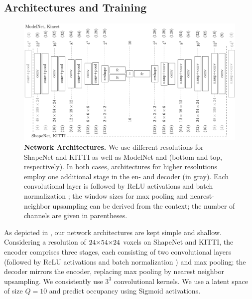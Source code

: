 \subsection{Architectures and Training}
\label{sec:training}

\begin{figure}
    \vspace*{-\figskipabove px}
    \centering
    \hspace*{-4px}
    \includegraphics[width=1.025\linewidth]{fig_architectures}
    \vspace*{-12px}
    \caption{{\bf Network Architectures.} We use different resolutions for ShapeNet and KITTI as well as ModelNet and \Kinect (bottom and top, respectively). In both cases, architectures for higher resolutions employ one additional stage in the en- and decoder (in {\color{gray}gray}). Each convolutional layer is followed by $\text{ReLU}$ activations and batch normalization \citep{Ioffe2015ICML}; the window sizes for max pooling and nearest-neighbor upsampling can be derived from the context; the number of channels are given in parentheses.}
    \label{fig:architectures}
    \vspace*{-\figskipbelow px}
\end{figure}

As depicted in , our network architectures are kept simple and shallow. Considering a resolution of $24 \operatorname*{\!\times\!} 54 \operatorname*{\!\times\!} 24$ voxels on ShapeNet and KITTI, the encoder comprises three stages, each consisting of two convolutional layers (followed by $\text{ReLU}$ activations and batch normalization \citep{Ioffe2015ICML}) and max pooling; the decoder mirrors the encoder, replacing max pooling by nearest neighbor upsampling. We consistently use $3^3$ convolutional kernels. We use a latent space of size $Q = 10$ and predict occupancy using Sigmoid activations.

